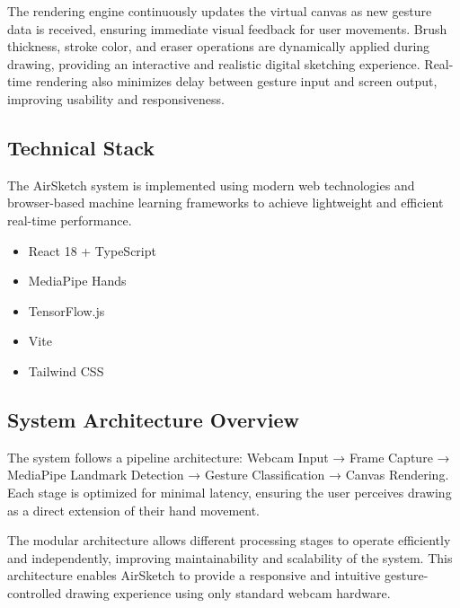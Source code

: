 \documentclass[conference]{IEEEtran}
\begin{document}
The rendering engine continuously updates the virtual canvas as new gesture data is received,
ensuring immediate visual feedback for user movements. Brush thickness, stroke color, and eraser
operations are dynamically applied during drawing, providing an interactive and realistic digital
sketching experience. Real-time rendering also minimizes delay between gesture input and screen
output, improving usability and responsiveness.

\subsection{Technical Stack}

The AirSketch system is implemented using modern web technologies and browser-based machine
learning frameworks to achieve lightweight and efficient real-time performance.

\begin{itemize}
    \item React 18 + TypeScript
    \item MediaPipe Hands
    \item TensorFlow.js
    \item Vite
    \item Tailwind CSS
\end{itemize}

\subsection{System Architecture Overview}

The system follows a pipeline architecture: Webcam Input → Frame Capture → MediaPipe
Landmark Detection → Gesture Classification → Canvas Rendering. Each stage is optimized for
minimal latency, ensuring the user perceives drawing as a direct extension of their hand movement.

The modular architecture allows different processing stages to operate efficiently and independently,
improving maintainability and scalability of the system. This architecture enables AirSketch to provide a
responsive and intuitive gesture-controlled drawing experience using only standard webcam
hardware.
\end{document}
